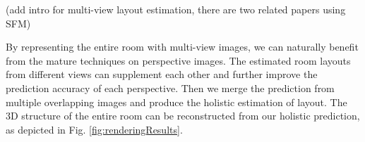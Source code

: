 (add intro for multi-view layout estimation, there are two related papers using SFM) 


By representing the entire room with multi-view images, we can naturally benefit from the mature techniques on perspective images. The estimated room layouts from different views can supplement each other and further improve the prediction accuracy of each perspective. Then we merge the prediction from multiple overlapping images and produce the holistic estimation of layout. The 3D structure of the entire room can be reconstructed from our holistic prediction, as depicted in Fig. \ref{fig:renderingResults}.

